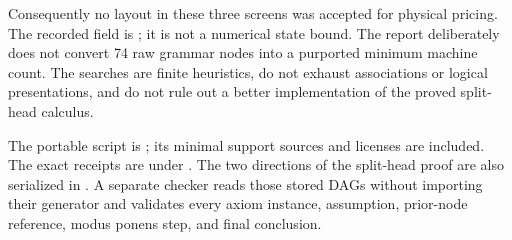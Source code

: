 Consequently no layout in these three screens was accepted for physical
pricing. The recorded  field is ; it is
not a numerical state bound. The report deliberately does not convert
74 raw grammar nodes into a purported minimum machine count. The
searches are finite heuristics, do not exhaust associations or logical
presentations, and do not rule out a better implementation of the
proved split-head calculus.

The portable script is ; its minimal
support sources and licenses are included. The exact receipts are under
. The two directions of the split-head proof are also
serialized in . A separate
checker reads those stored DAGs without importing their generator and
validates every axiom instance, assumption, prior-node reference, modus
ponens step, and final conclusion.



